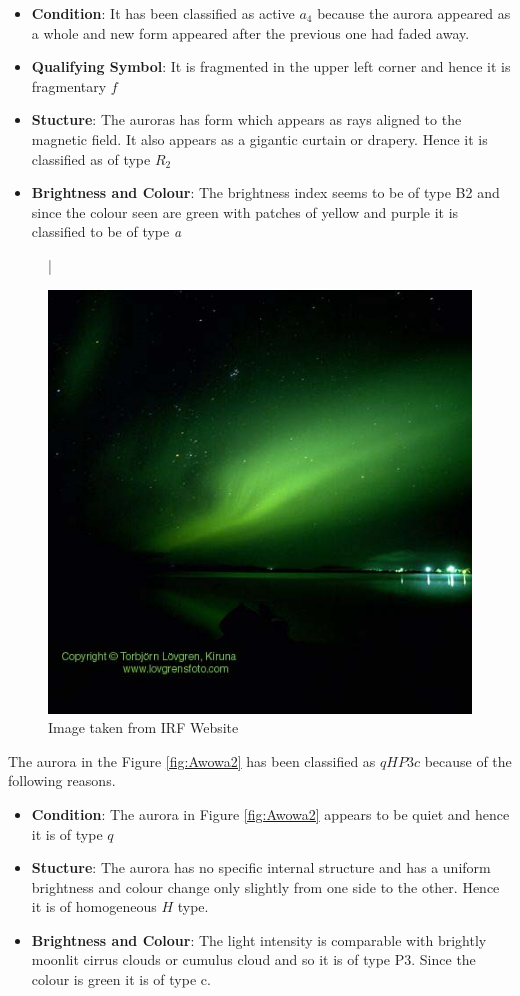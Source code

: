 \documentclass{article}
\begin{document}
\begin{itemize}
\item \textbf{Condition}:  It has been classified as active $ a_4 $ because the aurora appeared as a whole and new form appeared after the previous one had faded away.
\item \textbf{Qualifying Symbol}: It is fragmented in the upper left corner and hence it is fragmentary $ f $
\item \textbf{Stucture}: The auroras has form which appears as rays aligned to the magnetic field. It also appears as a gigantic curtain or drapery. Hence it is classified as of type $ R_2 $
\item \textbf{Brightness and Colour}: The brightness index seems to be of type B2 and since the colour seen are green with patches of yellow and purple it is classified to be of type \textit{a}
\end{itemize}

\begin{figure}[htbp!]
\centering|
\centerline{\includegraphics[scale=2]{Figures/awowa1.jpg}}
\caption{Image taken from IRF Website}
\label{fig:Awowa1}
\end{figure}

The aurora in the Figure \ref{fig:Awowa2} has been classified as $qHP3c$ because of the following reasons.

\begin{itemize}
\item \textbf{Condition}:  The aurora in Figure \ref{fig:Awowa2} appears to be quiet and hence it is of type $ q $ 
\item \textbf{Stucture}: The aurora has no specific internal structure and has a uniform brightness and colour change only slightly from one side to the other. Hence it is of homogeneous $ H $ type. 
\item \textbf{Brightness and Colour}: The light intensity is comparable with brightly moonlit cirrus clouds or cumulus cloud and so it is of type P3. Since the colour is green it is of type c.
\end{itemize}
\end{document}

